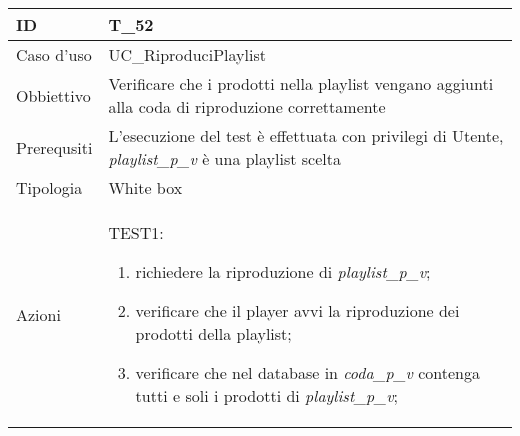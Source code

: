 \begin{table}[hb]
    \centering
    \begin{tabular}{ |p{2cm}|p{10cm}|  }
        \hline
        ID          & T\_52                                                                 \\\hline
        Caso d'uso  & UC\_RiproduciPlaylist                                                    \\\hline
        Obbiettivo  & Verificare che i prodotti nella playlist vengano aggiunti alla coda di riproduzione correttamente \\\hline
        Prerequsiti & L'esecuzione del test è effettuata con privilegi di Utente, \emph{playlist\_p\_v}
        è una playlist scelta \\\hline
        Tipologia   & White box                                                             \\\hline
        Azioni      &
        TEST1:
        \begin{enumerate}[nosep, topsep=0pt]
            \item richiedere la riproduzione di \emph{playlist\_p\_v};
            \item verificare che il player avvi la riproduzione dei prodotti della playlist;
            \item verificare che nel database in \emph{coda\_p\_v} contenga tutti e soli i prodotti di \emph{playlist\_p\_v};
        \end{enumerate}
        \\\hline
    \end{tabular}
\end{table}

